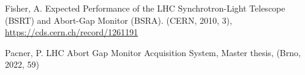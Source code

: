 {\begin{thebibliography}{99}
        Fisher, A. Expected Performance of the LHC
            Synchrotron-Light Telescope (BSRT) and Abort-Gap Monitor (BSRA).
            (CERN, 2010, 3), \url{https://cds.cern.ch/record/1261191}

        Pacner, P. LHC Abort Gap Monitor
            Acquisition System, Master thesis, (Brno, 2022, 59)

% 

    \end{thebibliography}
} %
